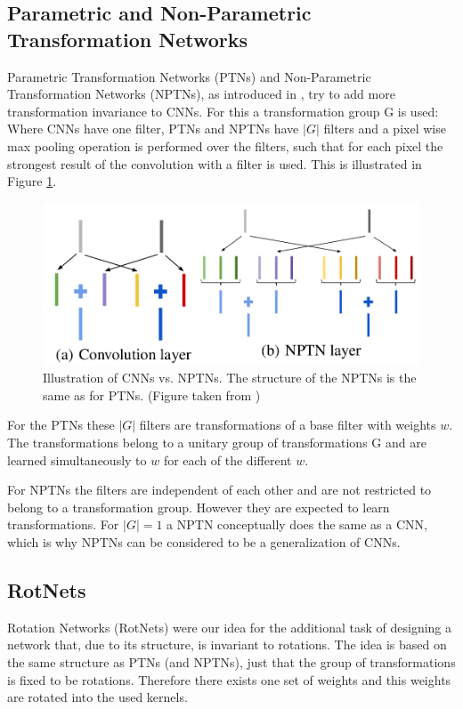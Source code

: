 \documentclass{llncs}
\begin{document}
\subsection{Parametric and Non-Parametric Transformation Networks}

Parametric Transformation Networks (PTNs) and Non-Parametric Transformation Networks (NPTNs), as introduced in \cite{NPTN18}, try to add more transformation invariance to CNNs. For this a transformation group G is used:
Where CNNs have one filter, PTNs and NPTNs have $|G|$ filters and a pixel wise max pooling operation is performed over the filters, such that for each pixel the strongest result of the convolution with a filter is used. This is illustrated in Figure \ref{pic:nptn}.


\begin{figure}
	\begin{center}
	\includegraphics[scale=0.15]{result_images/nptn_paper.png}
	\caption{Illustration of CNNs vs. NPTNs. The structure of the NPTNs is the same as for PTNs. (Figure taken from \cite{NPTN18})}
	\label{pic:nptn}
	\end{center}
\end{figure}
For the PTNs these $|G|$ filters are transformations of a base filter with weights $w$. The transformations belong to a unitary group of transformations G and are learned simultaneously to $w$ for each of the different $w$. 


For NPTNs the filters are independent of each other and are not restricted to belong to a transformation group. However they are expected to learn transformations.
For $|G|=1$ a NPTN conceptually does the same as a CNN, which is why NPTNs can be considered to be a generalization of CNNs. 



\subsection{RotNets}
Rotation Networks (RotNets) were our idea for the additional task of designing a network that, due to its structure, is invariant to rotations. 
The idea is based on the same structure as PTNs (and NPTNs), just that the group of transformations is fixed to be rotations. Therefore there exists one set of weights and this weights are rotated into the used kernels. 
\newcommand{\pytorch}{PyTorch }
\end{document}
